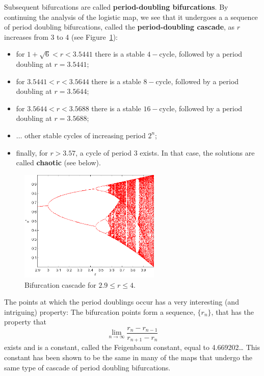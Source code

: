 Subsequent bifurcations are called \textbf{period-doubling bifurcations}. By continuing the analysis of the logistic map, we see that it undergoes a a sequence of period doubling bifurcations, called the \textbf{period-doubling cascade}, as $r$ increases from 3 to 4 (see Figure~\ref{fig:bif_cascade_29_4}):
\begin{itemize}
\item for $1+\sqrt{6}<r<3.5441$ there is a stable $4-$cycle, followed by a period doubling at $r=3.5441$;
\item for $3.5441<r<3.5644$ there is a stable $8-$cycle, followed by a period doubling at $r=3.5644$;
\item for $3.5644<r<3.5688$ there is a stable $16-$cycle, followed by a period doubling at $r = 3.5688$;
\item $\ldots$ other stable cycles of increasing period $2^n$;
\item finally, for $r> 3.57$, a cycle of period $3$ exists. In that case, the solutions are called \textbf{chaotic} (see below).
\end{itemize}
\begin{figure}[htbp]
\begin{center}
\includegraphics[width=0.6\textwidth]
{../figs_02_population_growth/cascade_29_4}
\caption{Bifurcation cascade for $2.9\leq r\leq 4$.}
\label{fig:bif_cascade_29_4}
\end{center}
\end{figure}
The points at which the period doublings occur has a very interesting (and intriguing) property:
The bifurcation points form a sequence, $\{r_n\}$, that has the property that
\[
\lim_{n\to\infty}\frac{r_n-r_{n-1}}{r_{n+1}-r_n}
\]
exists and is a constant, called the Feigenbaum constant, equal to 4.669202\ldots
This constant has been shown to be the same in many of the maps that undergo the same type of cascade of period doubling bifurcations.

